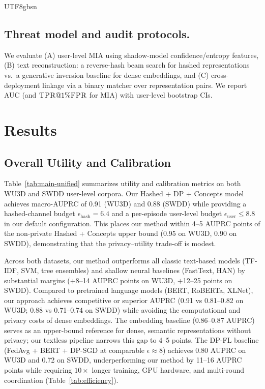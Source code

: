 \documentclass[lettersize,journal]{IEEEtran}
\begin{document}
\begin{CJK*}{UTF8}{gbsn}
\subsection{Threat model and audit protocols.}
We evaluate (A) user-level \textsc{MIA} using shadow-model confidence/entropy features, (B) text reconstruction: a reverse-hash beam search for hashed representations vs.\ a generative inversion baseline for dense embeddings, and (C) cross-deployment linkage via a binary matcher over representation pairs. We report \textsc{AUC} (and $\textsc{TPR}@1\%\textsc{FPR}$ for \textsc{MIA}) with user-level bootstrap CIs.

\section{Results}
\label{sec:results}
\subsection{Overall Utility and Calibration}
\label{sec:results:utility}

Table~\ref{tab:main-unified} summarizes utility and calibration metrics on both WU3D and SWDD user-level corpora. Our Hashed + DP + Concepts model achieves macro-AUPRC of 0.91 (WU3D) and 0.88 (SWDD) while providing a hashed-channel budget $\epsilon_{\text{hash}}{=}6.4$ and a per-episode user-level budget $\epsilon_{\text{user}}{\le}8.8$ in our default configuration. This places our method within 4--5 AUPRC points of the non-private Hashed + Concepts upper bound (0.95 on WU3D, 0.90 on SWDD), demonstrating that the privacy--utility trade-off is modest.

Across both datasets, our method outperforms all classic text-based models (TF-IDF, SVM, tree ensembles) and shallow neural baselines (FastText, HAN) by substantial margins ($+$8--14 AUPRC points on WU3D, $+$12--25 points on SWDD). Compared to pretrained language models (BERT, RoBERTa, XLNet), our approach achieves competitive or superior AUPRC (0.91 vs 0.81--0.82 on WU3D; 0.88 vs 0.71--0.74 on SWDD) while avoiding the computational and privacy costs of dense embeddings. The embedding baseline (0.86--0.87 AUPRC) serves as an upper-bound reference for dense, semantic representations without privacy; our textless pipeline narrows this gap to 4--5 points.
The DP-FL baseline (FedAvg + BERT + DP-SGD at comparable $\epsilon{\approx}8$) achieves 0.80 AUPRC on WU3D and 0.72 on SWDD, underperforming our method by 11--16 AUPRC points while requiring $10{\times}$ longer training, GPU hardware, and multi-round coordination (Table~\ref{tab:efficiency}).


\end{CJK*}
\end{document}
